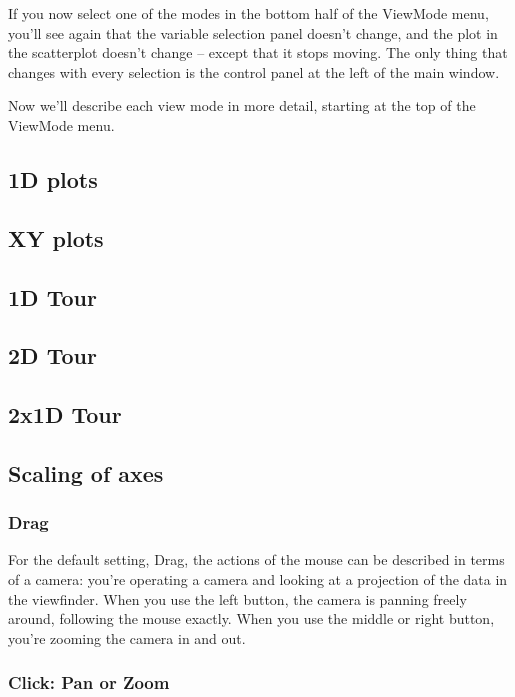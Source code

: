 \documentclass[11pt]{article}
\begin{document}
If you now select one of the modes in the bottom half of the ViewMode
menu, you'll see again that the variable selection panel doesn't
change, and the plot in the scatterplot doesn't change -- except
that it stops moving.  The only thing that changes with every
selection is the control panel at the left of the main window.

Now we'll describe each view mode in more detail, starting at the
top of the ViewMode menu. 

\subsection{1D plots}

\subsection{XY plots}

\subsection{1D Tour}
\label{slbl:1DTour}
\subsection{2D Tour}
\label{slbl:2DTour}
\subsection{2x1D Tour}
\label{slbl:2x1DTour}

\subsection{Scaling of axes}
\label{slbl:Scaling}

\subsubsection{Drag}

For the default setting, Drag, the actions of the mouse can be
described in terms of a camera:  you're operating a camera and
looking at a projection of the data in the viewfinder.  When you use
the left button, the camera is panning freely around, following the
mouse exactly.  When you use the middle or right button, you're
zooming the camera in and out.

\subsubsection{Click: Pan or Zoom}
\end{document}
